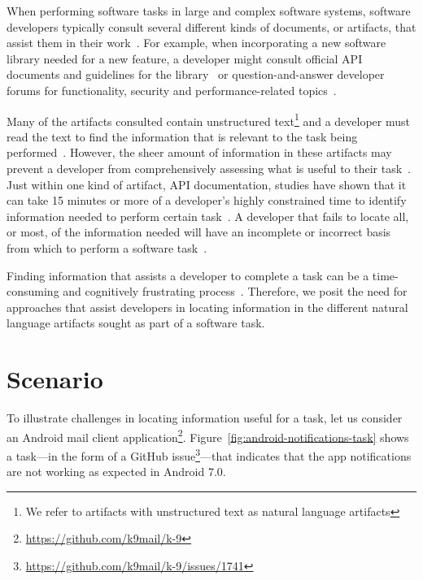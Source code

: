 

When performing software tasks in large and complex software systems, software developers typically consult several different kinds of documents, or artifacts, that assist them in their work~\cite{Starke2009, Meyer2017}. For example, 
when incorporating a new software library needed for a new feature, a developer might consult official API documents and guidelines for the library~\cite{robillard2011field, umarji2008archetypal} or 
 question-and-answer developer forums for functionality, security and performance-related topics~\cite{parnin2012, silva2019}.



Many of the artifacts consulted
contain unstructured text\footnote{We refer to artifacts with unstructured text as natural language artifacts} and 
a developer must read the text to find the information that is relevant to the task being performed~\cite{Bavota2016}.
However, 
the sheer amount of information in these artifacts may prevent a developer from comprehensively assessing what is useful to their task~\cite{Murphy2005}.
Just within one kind of artifact, API
documentation, studies have shown that it can take 15 minutes or more
of a developer's highly constrained time to identify 
information needed to perform certain task~\cite{endrikat2014, Meyer2017}. 
A developer that fails to locate all, or most, of the information needed
will have an incomplete or incorrect basis from which to perform a software task~\cite{Murphy2005}.



Finding information that assists a developer to complete a task can be a time-consuming
 and cognitively frustrating process~\cite{Begel2008,
 robillard2011field}. Therefore, we posit the need for approaches that assist developers in locating information in the different natural language artifacts sought  as part of a software task.

 
 






 \section{Scenario}
 \label{cp1:example}
 
 
 
 To illustrate challenges in locating information useful for a task, let us consider an  Android mail client application\footnote{\url{https://github.com/k9mail/k-9}}.
 Figure~\ref{fig:android-notifications-task} shows a task---in the form of a GitHub issue\footnote{\url{https://github.com/k9mail/k-9/issues/1741}}---that indicates that the app notifications 
 are not working as expected in Android 7.0. 
 

